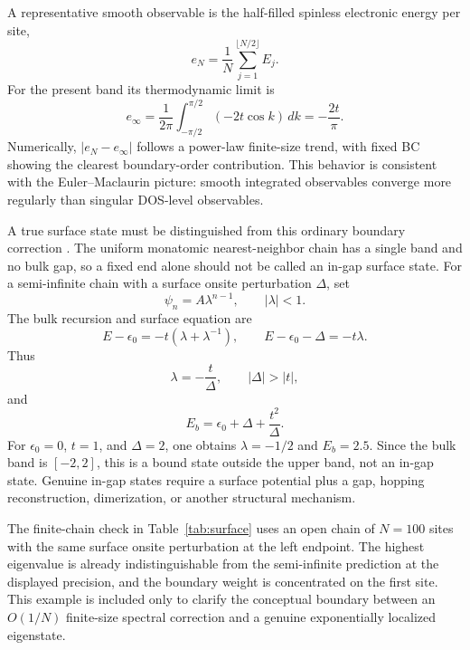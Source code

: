 ﻿\documentclass[a4paper,aps,prb,reprint,floatfix,nofootinbib,longbibliography]{revtex4-2}
\begin{document}
A representative smooth observable is the half-filled spinless electronic energy per site,
\begin{equation}
e_N=\frac{1}{N}\sum_{j=1}^{\lfloor N/2\rfloor}E_j .
\end{equation}
For the present band its thermodynamic limit is
\begin{equation}
e_\infty=\frac{1}{2\pi}\int_{-\pi/2}^{\pi/2}(-2t\cos k)\,dk
=-\frac{2t}{\pi}.
\end{equation}
Numerically, \(|e_N-e_\infty|\) follows a power-law finite-size trend, with fixed BC showing the clearest boundary-order contribution.  This behavior is consistent with the Euler--Maclaurin picture: smooth integrated observables converge more regularly than singular DOS-level observables.

A true surface state must be distinguished from this ordinary boundary correction \cite{Davison,Tamm,Shockley}.  The uniform monatomic nearest-neighbor chain has a single band and no bulk gap, so a fixed end alone should not be called an in-gap surface state.  For a semi-infinite chain with a surface onsite perturbation \(\Delta\), set
\begin{equation}
\psi_n=A\lambda^{n-1},\qquad |\lambda|<1.
\end{equation}
The bulk recursion and surface equation are
\begin{equation}
E-\epsilon_0=-t(\lambda+\lambda^{-1}),\qquad
E-\epsilon_0-\Delta=-t\lambda.
\end{equation}
Thus
\begin{equation}
\lambda=-\frac{t}{\Delta},\qquad |\Delta|>|t|,
\end{equation}
and
\begin{equation}
E_b=\epsilon_0+\Delta+\frac{t^2}{\Delta}.
\end{equation}
For \(\epsilon_0=0\), \(t=1\), and \(\Delta=2\), one obtains \(\lambda=-1/2\) and \(E_b=2.5\).  Since the bulk band is \([-2,2]\), this is a bound state outside the upper band, not an in-gap state.  Genuine in-gap states require a surface potential plus a gap, hopping reconstruction, dimerization, or another structural mechanism.

The finite-chain check in Table~\ref{tab:surface} uses an open chain of \(N=100\) sites with the same surface onsite perturbation at the left endpoint.  The highest eigenvalue is already indistinguishable from the semi-infinite prediction at the displayed precision, and the boundary weight is concentrated on the first site.  This example is included only to clarify the conceptual boundary between an \(O(1/N)\) finite-size spectral correction and a genuine exponentially localized eigenstate.
\end{document}
